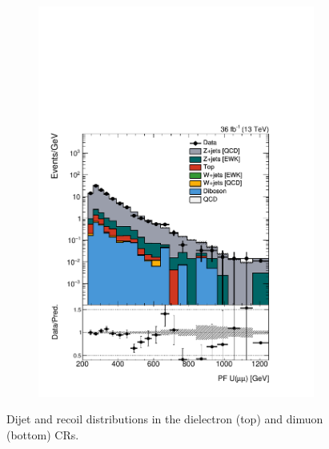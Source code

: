 \begin{figure}[]
\begin{center}
\begin{subfigure}[t]{0.24\textwidth}
            \includegraphics[width=\textwidth]{figures/vbf/prefit/dimuon_pfUZmag_logy.pdf}
        \end{subfigure}
        \caption{Dijet and recoil distributions in the dielectron (top) and dimuon (bottom) CRs.}
        \label{fig:vbf:zcr}
    \end{center}
\end{figure}

